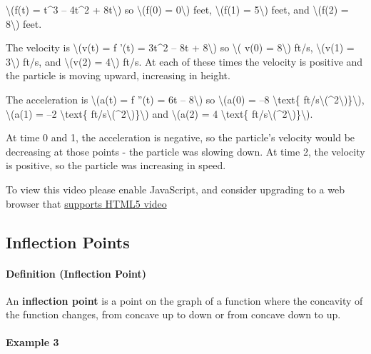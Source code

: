 \textbackslash{}(f(t) = t\^{}3 -- 4t\^{}2 + 8t\textbackslash{}) so
\textbackslash{}(f(0) = 0\textbackslash{}) feet, \textbackslash{}(f(1) =
5\textbackslash{}) feet, and \textbackslash{}(f(2) = 8\textbackslash{})
feet.

The velocity is \textbackslash{}(v(t) = f '(t) = 3t\^{}2 -- 8t +
8\textbackslash{}) so \textbackslash{}( v(0) = 8\textbackslash{}) ft/s,
\textbackslash{}(v(1) = 3\textbackslash{}) ft/s, and
\textbackslash{}(v(2) = 4\textbackslash{}) ft/s. At each of these times
the velocity is positive and the particle is moving upward, increasing
in height.

The acceleration is \textbackslash{}(a(t) = f ''(t) = 6t --
8\textbackslash{}) so \textbackslash{}(a(0) = --8 \textbackslash{}text\{
ft/s\textbackslash{}(\^{}2\textbackslash{})\}\textbackslash{}),
\textbackslash{}(a(1) = --2 \textbackslash{}text\{
ft/s\textbackslash{}(\^{}2\textbackslash{})\}\textbackslash{}) and
\textbackslash{}(a(2) = 4 \textbackslash{}text\{
ft/s\textbackslash{}(\^{}2\textbackslash{})\}\textbackslash{}).

At time 0 and 1, the acceleration is negative, so the particle's
velocity would be decreasing at those points - the particle was slowing
down. At time 2, the velocity is positive, so the particle was
increasing in speed.

To view this video please enable JavaScript, and consider upgrading to a
web browser that \href{http://videojs.com/html5-video-support/}{supports
HTML5 video}

\hypertarget{inflection-points}{%
\subsection{Inflection Points}\label{inflection-points}}

\hypertarget{definition-inflection-point}{%
\paragraph{Definition (Inflection
Point)}\label{definition-inflection-point}}

An \textbf{inflection point} is a point on the graph of a function where
the concavity of the function changes, from concave up to down or from
concave down to up.

\hypertarget{example-3}{%
\paragraph{Example 3}\label{example-3}}

